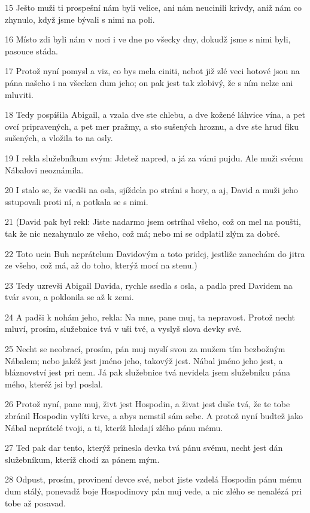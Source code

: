 \par 15 Ješto muži ti prospešní nám byli velice, ani nám neucinili krivdy, aniž nám co zhynulo, když jsme bývali s nimi na poli.
\par 16 Místo zdi byli nám v noci i ve dne po všecky dny, dokudž jsme s nimi byli, pasouce stáda.
\par 17 Protož nyní pomysl a viz, co bys mela ciniti, nebot již zlé veci hotové jsou na pána našeho i na všecken dum jeho; on pak jest tak zlobivý, že s ním nelze ani mluviti.
\par 18 Tedy pospíšila Abigail, a vzala dve ste chlebu, a dve kožené láhvice vína, a pet ovcí pripravených, a pet mer pražmy, a sto sušených hroznu, a dve ste hrud fíku sušených, a vložila to na osly.
\par 19 I rekla služebníkum svým: Jdetež napred, a já za vámi pujdu. Ale muži svému Nábalovi neoznámila.
\par 20 I stalo se, že vsedši na osla, sjíždela po stráni s hory, a aj, David a muži jeho sstupovali proti ní, a potkala se s nimi.
\par 21 (David pak byl rekl: Jiste nadarmo jsem ostríhal všeho, což on mel na poušti, tak že nic nezahynulo ze všeho, což má; nebo mi se odplatil zlým za dobré.
\par 22 Toto ucin Buh neprátelum Davidovým a toto pridej, jestliže zanechám do jitra ze všeho, což má, až do toho, kterýž mocí na stenu.)
\par 23 Tedy uzrevši Abigail Davida, rychle ssedla s osla, a padla pred Davidem na tvár svou, a poklonila se až k zemi.
\par 24 A padši k nohám jeho, rekla: Na mne, pane muj, ta nepravost. Protož necht mluví, prosím, služebnice tvá v uši tvé, a vyslyš slova devky své.
\par 25 Necht se neobrací, prosím, pán muj myslí svou za mužem tím bezbožným Nábalem; nebo jakéž jest jméno jeho, takovýž jest. Nábal jméno jeho jest, a bláznovství jest pri nem. Já pak služebnice tvá nevidela jsem služebníku pána mého, kteréž jsi byl poslal.
\par 26 Protož nyní, pane muj, živt jest Hospodin, a živat jest duše tvá, že te tobe zbránil Hospodin vylíti krve, a abys nemstil sám sebe. A protož nyní budtež jako Nábal neprátelé tvoji, a ti, kteríž hledají zlého pánu mému.
\par 27 Ted pak dar tento, kterýž prinesla devka tvá pánu svému, necht jest dán služebníkum, kteríž chodí za pánem mým.
\par 28 Odpust, prosím, provinení devce své, nebot jiste vzdelá Hospodin pánu mému dum stálý, ponevadž boje Hospodinovy pán muj vede, a nic zlého se nenalézá pri tobe až posavad.

